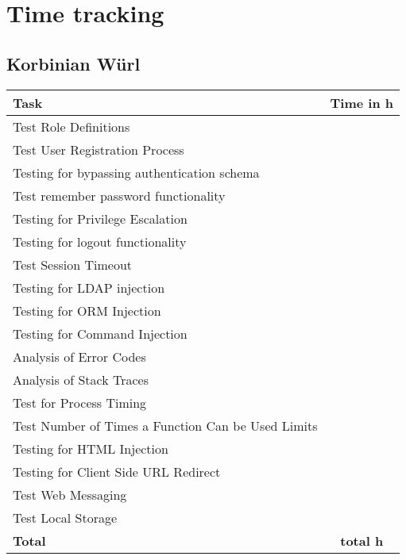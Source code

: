 \chapter{Time tracking}

\section{Korbinian Würl}
\begin{table}[H]
\tiny
\begin{tabular*}{\textwidth}{@{\extracolsep{\fill}} l c@{\extracolsep{0pt}} }
\textbf{Task} & \textbf{Time in h} \\ \hline
	Test Role Definitions						& \\
	Test User Registration Process				& \\
	Testing for bypassing authentication schema & \\
	Test remember password functionality		& \\
	Testing for Privilege Escalation			& \\
	Testing for logout functionality			& \\
	Test Session Timeout						& \\
	Testing for LDAP injection 					& \\
	Testing for ORM Injection 					& \\
	Testing for Command Injection 				& \\
	Analysis of Error Codes	   					& \\
	Analysis of Stack Traces 					& \\
	Test for Process Timing 					& \\
	Test Number of Times a Function Can be Used Limits & \\
	Testing for HTML Injection 					& \\
	Testing for Client Side URL Redirect 		& \\
	Test Web Messaging 							& \\
	Test Local Storage 							& \\
\hline\hline
\textbf{Total}								& \textbf{total h}
\end{tabular*}
\end{table}
\clearpage

